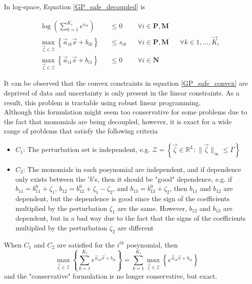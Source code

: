 In log-space, Equation \eqref{GP_safe_decoupled} is

\begin{equation}
\begin{aligned}
&\log(\textstyle{\sum}_{k=1}^{K_i}e^{s_{ik}}) &&\leq 0 &&\forall i \in \mathbf{P},\mathbf{M} \\
&\max_{\vec{\zeta} \in \mathcal{Z}} \left\{\vec{a}_{ik}\vec{x} + b_{ik}\right\} &&\leq s_{ik} &&\forall i \in \mathbf{P},\mathbf{M} &&\forall k \in 1,...,\vec{K}_i\\
&\max_{\vec{\zeta} \in \mathcal{Z}} \left\{\vec{a}_{i1}\vec{x} + b_{i1}\right\} &&\leq 0 &&\forall i \in \mathbf{N}
\end{aligned}
\label{GP_safe_convex}
\end{equation}

It can be observed that the convex constraints in equation \eqref{GP_safe_convex} are deprived of data and uncertainty is only present in the linear constraints. As a result, this problem is tractable using robust linear programming.\\[12pt]
Although this formulation might seem too conservative for some problems due to the fact that monomials are being decoupled, however, it is exact for a wide range of problems that satisfy the following criteria
\begin{itemize}
\item $C_1$: The perturbation set is independent, e.g. $\mathcal{Z} = \left\{ \vec{\zeta} \in \mathbb{R}^L: \|\vec{\zeta}\|_{\infty} \leq \Gamma\right\}$
\item $C_2$: The monomials in each posynomial are independent, and if dependence only exists between the $'b'$s, then it should be "good" dependence, e.g. if $b_{11} = b_{11}^0 + \zeta_1$, $b_{12} = b_{12}^0 + \zeta_1 - \zeta_2$, and $b_{13} = b_{13}^0 + \zeta_2$, then $b_{11}$ and $b_{12}$ are dependent, but the dependence is good since the sign of the coefficients multiplied by the perturbation $\zeta_1$ are the same. However, $b_{12}$ and $b_{13}$ are dependent, but in a bad way due to the fact that the signs of the coefficients multiplied by the perturbation $\zeta_2$ are different
\end{itemize}
When $C_1$ and $C_2$ are satisfied for the $i^{th}$ posynomial, then
$$
\max_{\vec{\zeta} \in \mathcal{Z}} \left\{\textstyle{\sum}_{k=1}^{K_i}e^{\vec{a}_{ik}\vec{x} + b_{ik}}\right\} = \sum_{k=1}^{K_i}\max_{\vec{\zeta} \in \mathcal{Z}} \left\{e^{\vec{a}_{ik}\vec{x} + b_{ik}}\right\}
$$
and the "conservative" formulation is no longer conservative, but exact.\\

